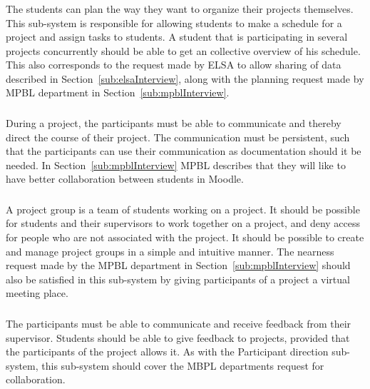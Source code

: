 \subsubsection{\timelinegroup{}} %
The students can plan the way they want to organize their projects themselves.
This sub-system is responsible for allowing students to make a schedule for a project and assign tasks to students.
A student that is participating in several projects concurrently should be able to get an collective overview of his schedule.%
This also corresponds to the request made by ELSA to allow sharing of data described in Section~\ref{sub:elsaInterview}, along with the planning request made by MPBL department in Section~\ref{sub:mpblInterview}.

\subsubsection{\blackboardgroup{}} %
During a project, the participants must be able to communicate and thereby direct the course of their project.%
The communication must be persistent, such that the participants can use their communication as documentation should it be needed.%
In Section~\ref{sub:mpblInterview} MPBL describes that they will like to have better collaboration between students in Moodle.

\subsubsection{\administrationgroup{}} %
A project group is a team of students working on a project.
It should be possible for students and their supervisors to work together on a project, and deny access for people who are not associated with the project.
It should be possible to create and manage project groups in a simple and intuitive manner.
The nearness request made by the MPBL department in Section~\ref{sub:mpblInterview} should also be satisfied in this sub-system by giving participants of a project a virtual meeting place.

\subsubsection{\supervisorgroup{}} %
The participants must be able to communicate and receive feedback from their supervisor.
Students should be able to give feedback to projects, provided that the participants of the project allows it.
As with the Participant direction sub-system, this sub-system should cover the MBPL departments request for collaboration.


